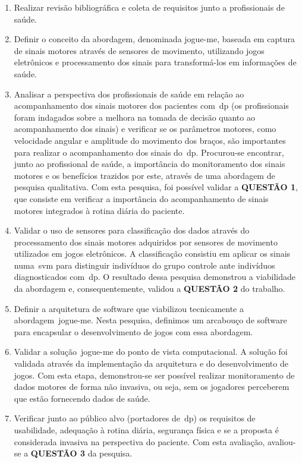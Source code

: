 \begin{enumerate}

\item{Realizar revisão bibliográfica e coleta de requisitos junto a profissionais de saúde.}

\item{Definir o conceito da abordagem, denominada \ac{jogue-me}, baseada em captura de sinais motores através de sensores de movimento, utilizando jogos eletrônicos e processamento dos sinais para transformá-los em informações de saúde.}


\item{Analisar a perspectiva dos profissionais de saúde em relação ao acompanhamento dos sinais motores dos pacientes com~\ac{dp} (os profissionais foram indagados sobre a melhora na tomada de decisão quanto ao acompanhamento dos sinais) e verificar se os parâmetros motores, como velocidade angular e amplitude do movimento dos braços, são importantes para realizar o acompanhamento dos sinais do~\ac{dp}. Procurou-se encontrar, junto ao profissional de saúde, a importância do monitoramento dos sinais motores e os benefícios trazidos por este, através de uma abordagem de pesquisa qualitativa. Com esta pesquisa, foi possível validar a \textbf{QUESTÃO 1}, que consiste em verificar a importância do acompanhamento de sinais motores integrados à rotina diária do paciente.}

\item{Validar o uso de sensores para classificação dos dados através do processamento dos sinais motores adquiridos por sensores de movimento utilizados em jogos eletrônicos. A classificação consistiu em aplicar os sinais numa~\ac{svm} para distinguir indivíduos do grupo controle ante indivíduos diagnosticados com~\ac{dp}.
O resultado dessa pesquisa demonstrou a viabilidade da abordagem e, consequentemente, validou a \textbf{QUESTÃO 2} do trabalho.}

\item{Definir a arquitetura de software que viabilizou tecnicamente a abordagem~\ac{jogue-me}. Nesta pesquisa, definimos um arcabouço de software para encapsular o desenvolvimento de jogos com essa abordagem.}

\item{Validar a solução~\ac{jogue-me} do ponto de vista computacional. A solução foi validada através da implementação da arquitetura e do desenvolvimento de jogos. Com esta etapa, demonstrou-se ser possível realizar monitoramento de dados motores de forma não invasiva, ou seja, sem os jogadores perceberem que estão fornecendo dados de saúde.}

\item{Verificar junto ao público alvo (portadores de~\ac{dp}) os requisitos de usabilidade, adequação à rotina diária, segurança física e se a proposta é considerada invasiva na perspectiva do paciente. Com esta avaliação, avaliou-se a \textbf{QUESTÃO 3} da pesquisa.}

\end{enumerate}

